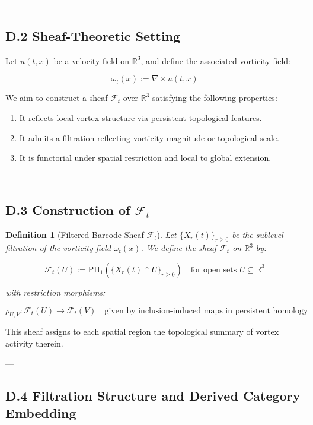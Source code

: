 \documentclass[11pt]{article}
\newtheorem{definition}[theorem]{Definition}
\begin{document}
---

\subsection*{D.2 Sheaf-Theoretic Setting}

Let \( u(t,x) \) be a velocity field on \( \mathbb{R}^3 \), and define the associated vorticity field:

\[
\omega_t(x) := \nabla \times u(t,x)
\]

We aim to construct a sheaf \( \mathcal{F}_t \) over \( \mathbb{R}^3 \) satisfying the following properties:

\begin{enumerate}
  \item It reflects local vortex structure via persistent topological features.
  \item It admits a filtration reflecting vorticity magnitude or topological scale.
  \item It is functorial under spatial restriction and local to global extension.
\end{enumerate}

---

\subsection*{D.3 Construction of \( \mathcal{F}_t \)}

\begin{definition}[Filtered Barcode Sheaf \( \mathcal{F}_t \)]
Let \( \{ X_r(t) \}_{r \ge 0} \) be the sublevel filtration of the vorticity field \( \omega_t(x) \).  
We define the sheaf \( \mathcal{F}_t \) on \( \mathbb{R}^3 \) by:

\[
\mathcal{F}_t(U) := \mathrm{PH}_1\left( \{ X_r(t) \cap U \}_{r \ge 0} \right)
\quad \text{for open sets } U \subseteq \mathbb{R}^3
\]

with restriction morphisms:

\[
\rho_{U,V} : \mathcal{F}_t(U) \to \mathcal{F}_t(V)
\quad \text{given by inclusion-induced maps in persistent homology}
\]
\end{definition}

This sheaf assigns to each spatial region the topological summary of vortex activity therein.

---

\subsection*{D.4 Filtration Structure and Derived Category Embedding}
\end{document}
